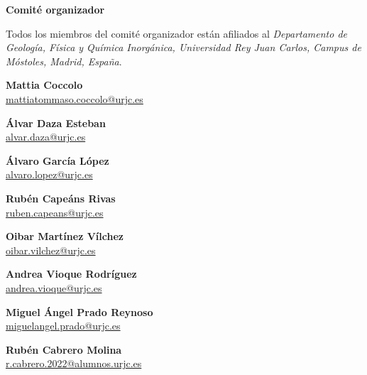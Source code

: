 \documentclass[11pt,a4paper]{article}
\begin{document}
\normalsize


\clearpage
{}
\label{sec:comite}

\begin{center}
{\LARGE\bfseries Comité organizador}
\end{center}

\vspace{0.5cm}

\noindent
Todos los miembros del comité organizador están afiliados al
\emph{Departamento de Geología, Física y Química Inorgánica,
Universidad Rey Juan Carlos, Campus de Móstoles, Madrid, España}.

\vspace{0.8cm}

\small

\noindent
\textbf{Mattia Coccolo}\\
\href{mailto:mattiatommaso.coccolo@urjc.es}
     {mattiatommaso.coccolo@urjc.es}

\medskip

\noindent
\textbf{Álvar Daza Esteban}\\
\href{mailto:alvar.daza@urjc.es}
     {alvar.daza@urjc.es}

\medskip

\noindent
\textbf{Álvaro García López}\\
\href{mailto:alvaro.lopez@urjc.es}
     {alvaro.lopez@urjc.es}

\medskip

\noindent
\textbf{Rubén Capeáns Rivas}\\
\href{mailto:ruben.capeans@urjc.es}
     {ruben.capeans@urjc.es}

\medskip

\noindent
\textbf{Oibar Martínez Vílchez}\\
\href{mailto:oibar.vilchez@urjc.es}
     {oibar.vilchez@urjc.es}

\medskip

\noindent
\textbf{Andrea Vioque Rodríguez}\\
\href{mailto:andrea.vioque@urjc.es}
     {andrea.vioque@urjc.es}

\medskip

\noindent
\textbf{Miguel Ángel Prado Reynoso}\\
\href{mailto:miguelangel.prado@urjc.es}
     {miguelangel.prado@urjc.es}

\medskip

\noindent
\textbf{Rubén Cabrero Molina}\\
\href{mailto:r.cabrero.2022@alumnos.urjc.es}
     {r.cabrero.2022@alumnos.urjc.es}

\normalsize
\end{document}
